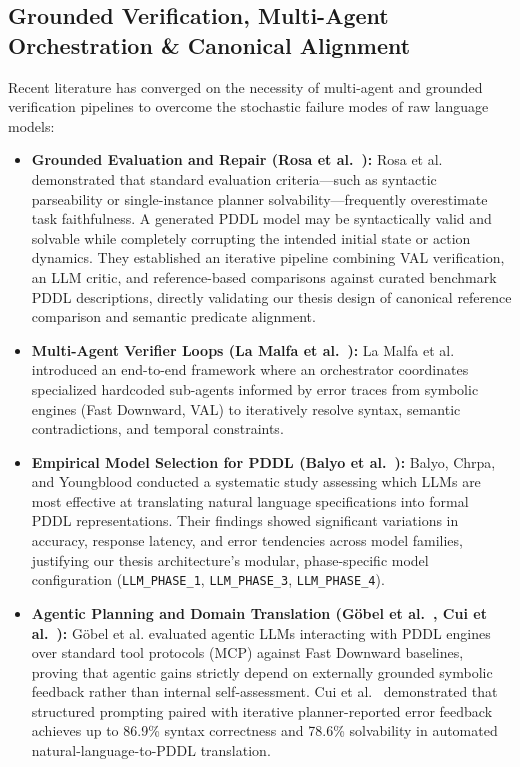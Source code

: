 \subsection{Grounded Verification, Multi-Agent Orchestration \& Canonical Alignment}
Recent literature has converged on the necessity of multi-agent and grounded verification pipelines to overcome the stochastic failure modes of raw language models:
\begin{itemize}
    \item \textbf{Grounded Evaluation and Repair (Rosa et al.~\cite{rosa2026grounded}):} Rosa et al. demonstrated that standard evaluation criteria—such as syntactic parseability or single-instance planner solvability—frequently overestimate task faithfulness. A generated PDDL model may be syntactically valid and solvable while completely corrupting the intended initial state or action dynamics. They established an iterative pipeline combining VAL verification, an LLM critic, and reference-based comparisons against curated benchmark PDDL descriptions, directly validating our thesis design of canonical reference comparison and semantic predicate alignment.
    \item \textbf{Multi-Agent Verifier Loops (La Malfa et al.~\cite{lamalfa2025endtoend}):} La Malfa et al. introduced an end-to-end framework where an orchestrator coordinates specialized hardcoded sub-agents informed by error traces from symbolic engines (Fast Downward, VAL) to iteratively resolve syntax, semantic contradictions, and temporal constraints.
    \item \textbf{Empirical Model Selection for PDDL (Balyo et al.~\cite{balyo2026whichllm}):} Balyo, Chrpa, and Youngblood conducted a systematic study assessing which LLMs are most effective at translating natural language specifications into formal PDDL representations. Their findings showed significant variations in accuracy, response latency, and error tendencies across model families, justifying our thesis architecture's modular, phase-specific model configuration (\texttt{LLM\_PHASE\_1}, \texttt{LLM\_PHASE\_3}, \texttt{LLM\_PHASE\_4}).
    \item \textbf{Agentic Planning and Domain Translation (G{\"o}bel et al.~\cite{gobel2026agentic}, Cui et al.~\cite{cui2026cve2ap}):} G{\"o}bel et al. evaluated agentic LLMs interacting with PDDL engines over standard tool protocols (MCP) against Fast Downward baselines, proving that agentic gains strictly depend on externally grounded symbolic feedback rather than internal self-assessment. Cui et al.~\cite{cui2026cve2ap} demonstrated that structured prompting paired with iterative planner-reported error feedback achieves up to 86.9\% syntax correctness and 78.6\% solvability in automated natural-language-to-PDDL translation.
\end{itemize}

